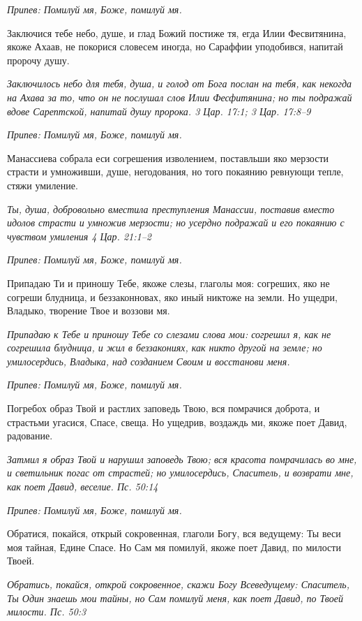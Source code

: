 \itshape Припев:\normalfont{} Помилуй мя, Боже, помилуй мя.


Заключися тебе небо, душе, и глад Божий постиже тя, егда Илии Фесвитянина, якоже Ахаав, не покорися словесем иногда, но Сараффии уподобився, напитай пророчу душу.


\itshape Заключилось небо для тебя, душа, и голод от Бога послан на тебя, как некогда на Ахава за то, что он не послушал слов Илии Фесфитянина; но ты подражай вдове Сарептской, напитай душу пророка. 3 Цар. 17:1; 3 Цар. 17:8–9\normalfont{}


\itshape Припев:\normalfont{} Помилуй мя, Боже, помилуй мя.


Манассиева собрала еси согрешения изволением, поставльши яко мерзости страсти и умноживши, душе, негодования, но того покаянию ревнующи тепле, стяжи умиление.


\itshape Ты, душа, добровольно вместила преступления Манассии, поставив вместо идолов страсти и умножив мерзости; но усердно подражай и его покаянию с чувством умиления 4 Цар. 21:1–2\normalfont{}


\itshape Припев:\normalfont{} Помилуй мя, Боже, помилуй мя.


Припадаю Ти и приношу Тебе, якоже слезы, глаголы моя: согреших, яко не согреши блудница, и беззаконновах, яко иный никтоже на земли. Но ущедри, Владыко, творение Твое и воззови мя.


\itshape Припадаю к Тебе и приношу Тебе со слезами слова мои: согрешил я, как не согрешила блудница, и жил в беззакониях, как никто другой на земле; но умилосердись, Владыка, над созданием Своим и восстанови меня.\normalfont{}


\itshape Припев:\normalfont{} Помилуй мя, Боже, помилуй мя.


Погребох образ Твой и растлих заповедь Твою, вся помрачися доброта, и страстьми угасися, Спасе, свеща. Но ущедрив, воздаждь ми, якоже поет Давид, радование.


\itshape Затмил я образ Твой и нарушил заповедь Твою; вся красота помрачилась во мне, и светильник погас от страстей; но умилосердись, Спаситель, и возврати мне, как поет Давид, веселие. Пс. 50:14\normalfont{}


\itshape Припев:\normalfont{} Помилуй мя, Боже, помилуй мя.


Обратися, покайся, открый сокровенная, глаголи Богу, вся ведущему: Ты веси моя тайная, Едине Спасе. Но Сам мя помилуй, якоже поет Давид, по милости Твоей.


\itshape Обратись, покайся, открой сокровенное, скажи Богу Всеведущему: Спаситель, Ты Один знаешь мои тайны, но Сам помилуй меня, как поет Давид, по Твоей милости. Пс. 50:3\normalfont{}


